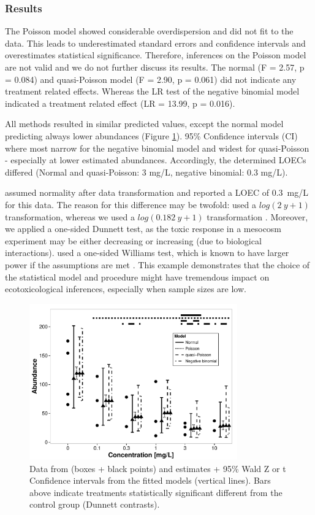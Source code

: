 \documentclass{scrartcl}
\begin{document}
\subsubsection{Results}
The Poisson model showed considerable overdispersion and did not fit to the data. 
This leads to underestimated standard errors and confidence intervals and overestimates statistical significance.
Therefore, inferences on the Poisson model are not valid and we do not further discuss its results.
The normal (F = 2.57, p = 0.084) and quasi-Poisson model (F = 2.90, p = 0.061) did not indicate any treatment related effects.
Whereas the LR test of the negative binomial model indicated a treatment related effect (LR = 13.99, p = 0.016).

All methods resulted in similar predicted values, except the normal model predicting always lower abundances (Figure \ref{fig:example}). 
95\% Confidence intervals (CI) where most narrow for the negative binomial model and widest for quasi-Poisson - especially at lower estimated abundances.
Accordingly, the determined LOECs differed (Normal and quasi-Poisson: 3 mg/L, negative binomial: 0.3 mg/L).

\citet{brock_minimum_2015} assumed normality after data transformation and reported a LOEC of \mbox{0.3 mg/L} for this data.
The reason for this difference may be twofold: \citep{brock_minimum_2015} used a $log(2~y + 1)$ transformation, whereas we used a $log(0.182~y + 1)$ transformation \citep{van_den_brink_impact_2000}.
Moreover, we applied a one-sided Dunnett test, as the toxic response in a mesocosm experiment may be either decreasing or increasing (due to biological interactions).
\citet{brock_minimum_2015} used a one-sided Williams test, which is known to have larger power if the assumptions are met \citep{jaki_statistical_2013}.
This example demonstrates that the choice of the statistical model and procedure might have tremendous impact on ecotoxicological inferences, especially when sample sizes are low.

\begin{figure}[h]
  \centering
  \includegraphics[width = 0.8\textwidth]{example.pdf}
  \caption{Data from \citet{brock_minimum_2015} (boxes + black points) and estimates + 95\% Wald Z or t Confidence intervals from the fitted models (vertical lines). 
  Bars above indicate treatments statistically significant different from the control group (Dunnett contrasts).}
  \label{fig:example}
\end{figure}
\end{document}
